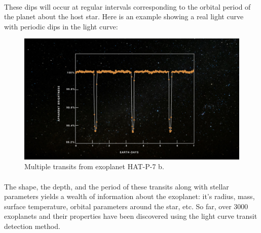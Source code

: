 \documentclass{article}
\begin{document}
\paragraph{}
These dips will occur at regular intervals corresponding to the orbital period of the planet about the host star. Here is an example showing a real light curve with periodic dips in the light curve:
 \begin{figure}[H]
	\begin{center}
		\includegraphics[totalheight=6cm]{figures/exo_multiple_transit.jpg}
	\end{center}
	\caption{Multiple transits from exoplanet HAT-P-7 b.}
\end{figure}
\paragraph{} The shape, the depth, and the period of these transits along with stellar parameters yields a wealth of information about the exoplanet: it's radius, mass, surface temperature, orbital parameters around the star, etc. 
So far, over 3000 exoplanets and their properties have been discovered using the light curve transit detection method. 
\end{document}
